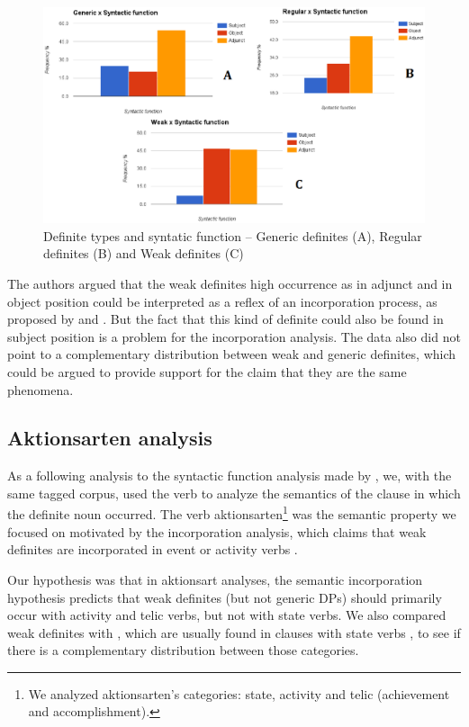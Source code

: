 \documentclass[output=paper,
modfonts
]{langscibook}
\begin{document}
\begin{figure}[H]
\centering
\includegraphics[width=1\textwidth]{figures/fig_tipo_sintaxe}
\caption{Definite types and syntatic function -- Generic definites (A), Regular definites (B) and Weak definites (C) \citep[114, 115]{deSaEtAlii2016}}
\label{fig:desaetal:1}
\end{figure}

The authors argued that the weak definites high occurrence as in adjunct and in object position could be interpreted as a reflex of an incorporation process, as proposed by \citet{CarlsonEtAlii2013} and \citet{KleinEtAlii2013}. But the fact that this kind of definite could also be found in subject position is a problem for the incorporation analysis. The data also did not point to a complementary distribution between weak and generic definites, which could be argued to provide support for the claim that they are the same phenomena.

\subsection{Aktionsarten analysis}

As a following analysis to the syntactic function analysis made by \citet{deSaEtAlii2016}, we, with the same tagged corpus, used the verb to analyze the semantics of the clause in which the definite noun occurred. The verb aktionsarten\footnote{We analyzed \citet{Vendler1957} aktionsarten's categories: state, activity and telic (achievement and accomplishment).} was the semantic property we focused on motivated by the incorporation analysis, which claims that weak definites are incorporated in event or activity verbs \citep{CarlsonEtAlii2013}. 

Our hypothesis was that in aktionsart analyses, the semantic incorporation hypothesis predicts that weak definites (but not generic DPs) should primarily occur with activity and telic verbs, but not with state verbs. We also compared weak definites with , which are usually found in clauses with state verbs \citep{Carlson2006}, to see if there is a complementary distribution between those categories.
\end{document}
